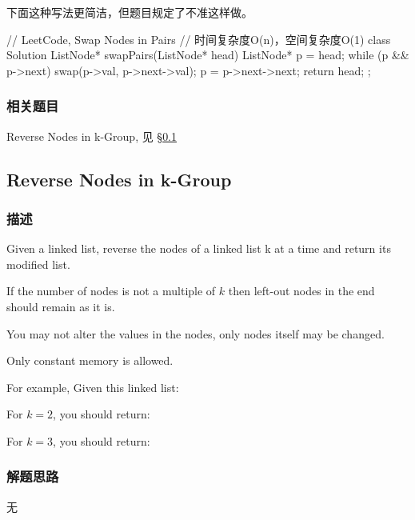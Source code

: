下面这种写法更简洁，但题目规定了不准这样做。
\begin{Code}
	// LeetCode, Swap Nodes in Pairs
	// 时间复杂度O(n)，空间复杂度O(1)
	class Solution {
		ListNode* swapPairs(ListNode* head) {
			ListNode* p = head;
			while (p && p->next) {
				swap(p->val, p->next->val);
				p = p->next->next;
			}
			return head;
		}
	};
\end{Code}

\subsubsection{相关题目}

\begindot
\item Reverse Nodes in k-Group, 见 \S \ref{sec:reverse-nodes-in-k-group}
\myenddot


\subsection{Reverse Nodes in k-Group}
\label{sec:reverse-nodes-in-k-group}


\subsubsection{描述}
Given a linked list, reverse the nodes of a linked list k at a time and return 
its modified list.

If the number of nodes is not a multiple of $k$ then left-out nodes in the end 
should remain as it is.

You may not alter the values in the nodes, only nodes itself may be changed.

Only constant memory is allowed.

For example,
Given this linked list: 

For $k = 2$, you should return: 

For $k = 3$, you should return: 


\subsubsection{解题思路}
无


